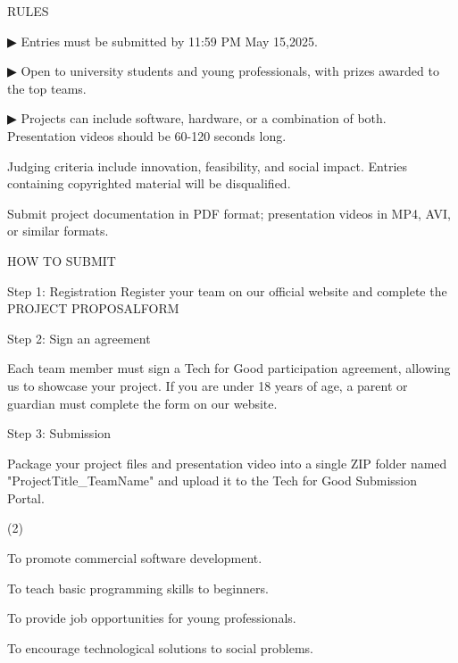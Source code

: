 \documentclass{英语试卷}
\begin{document}
\vspace{0.4em}
\par RULES\par
\par ▶ Entries must be submitted by 11:59 PM May 15,2025.\par
\par ▶ Open to university students and young professionals, with prizes awarded to the top teams.\par
\par ▶ Projects can include software, hardware, or a combination of both. Presentation videos should be 60-120 seconds long.\par
\par Judging criteria include innovation, feasibility, and social impact. Entries containing copyrighted material will be disqualified.\par
\par Submit project documentation in PDF format; presentation videos in MP4, AVI, or similar formats.\par
\par HOW TO SUBMIT\par
\par Step 1: Registration Register your team on our official website and complete the PROJECT PROPOSALFORM\par
\par Step 2: Sign an agreement\par
\par Each team member must sign a Tech for Good participation agreement, allowing us to showcase your project. If you are under 18 years of age, a parent or guardian must complete the form on our website.\par
\par Step 3: Submission\par
\par Package your project files and presentation video into a single ZIP folder named "ProjectTitle\_TeamName" and upload it to the Tech for Good Submission Portal.\par
{}
\begin{choices}(2)
  \item To promote commercial software development.
  \item To teach basic programming skills to beginners.
  \item To provide job opportunities for young professionals.
  \item To encourage technological solutions to social problems.
\end{choices}
\end{document}
